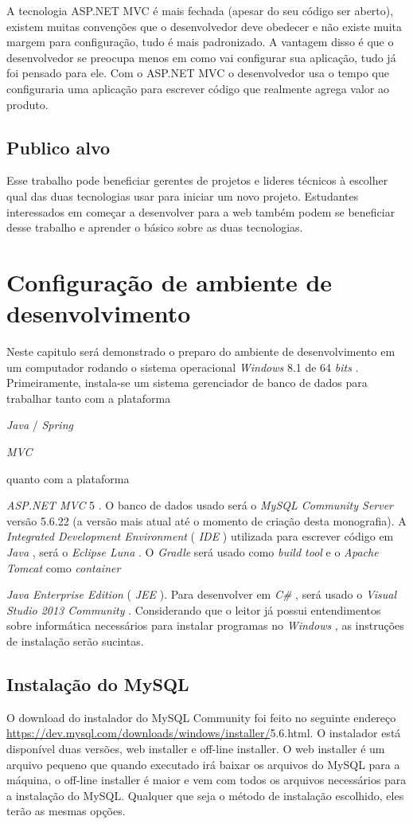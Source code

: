 \documentclass[a4paper,12pt]{article}
\newcommand{\anmvc} {
\sigla{ASP.NET MVC} 5
}
\newcommand{\spring} {
\lang{Java}/\est{Spring} \sigla{MVC}
}
\newcommand{\est}[1] {
	\textit{#1}
}
\newcommand{\sigla}[1] {
	\textit{#1}
}
\newcommand{\lang}[1] {
	\textit{#1}
}
\begin{document}
A tecnologia ASP.NET MVC é mais fechada (apesar do seu código ser aberto), existem muitas convenções que o desenvolvedor deve obedecer e não existe muita margem para configuração, tudo é mais padronizado. A vantagem disso é que o desenvolvedor se preocupa menos em como vai configurar sua aplicação, tudo já foi pensado para ele. Com o ASP.NET MVC o desenvolvedor usa o tempo que configuraria uma aplicação para escrever código que realmente agrega valor ao produto.

\subsection{Publico alvo}

Esse trabalho pode beneficiar gerentes de projetos e lideres técnicos à escolher qual das duas tecnologias usar para iniciar um novo projeto. Estudantes interessados em começar a desenvolver para a web também podem se beneficiar desse trabalho e aprender o básico sobre as duas tecnologias.

\newpage
\section{Configuração de ambiente de desenvolvimento}

Neste capitulo será demonstrado o preparo do ambiente de desenvolvimento em um computador rodando o sistema operacional \est{Windows} 8.1 de 64 \est{bits}. Primeiramente, instala-se um sistema gerenciador de banco de dados para trabalhar tanto com a plataforma \spring quanto com a plataforma \anmvc.  O banco de dados usado será o \est{MySQL Community Server} versão 5.6.22 (a versão mais atual até o momento de criação desta monografia). A \est{Integrated Development Environment} (\sigla{IDE}) utilizada  para escrever código em \lang{Java}, será o \est{Eclipse Luna}. O \est{Gradle} será usado como \est{build tool} e o \est{Apache Tomcat} como \est{container} \est{Java Enterprise Edition} (\sigla{JEE}). Para desenvolver em \lang{C\#}, será usado o \est{Visual Studio 2013 Community}. Considerando que o leitor já possui entendimentos sobre informática necessários para instalar programas no \est{Windows}, as instruções de instalação serão sucintas. 

\subsection{Instalação do MySQL}

O download do instalador do MySQL Community foi feito no seguinte endereço \url{https://dev.mysql.com/downloads/windows/installer/}5.6.html. O instalador está disponível duas versões, web installer e off-line installer. O web installer é um arquivo pequeno que quando executado irá baixar os arquivos do MySQL para a máquina, o off-line installer  é maior e vem com todos os arquivos necessários para a  instalação do MySQL. Qualquer que seja o método de instalação escolhido, eles terão as mesmas opções.
\end{document}
